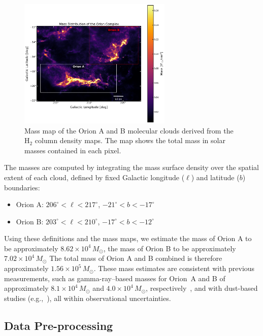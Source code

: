 \begin{figure}[t]
    \centering
    \includegraphics[width=0.65\textwidth]{figures/mass_distribution.png}
    \caption{Mass map of the Orion A and B molecular clouds derived from the H$_2$ column density maps. The map shows the total mass in solar masses contained in each pixel.}
    \label{fig:mass_map}
\end{figure}

The masses are computed by integrating the mass surface density over the spatial extent of each cloud, defined by fixed Galactic longitude ($\ell$) and latitude ($b$) boundaries:

\begin{itemize}
    \item Orion A: $206^\circ < \ell < 217^\circ$, $-21^\circ < b < -17^\circ$
    \item Orion B: $203^\circ < \ell < 210^\circ$, $-17^\circ < b < -12^\circ$
\end{itemize}

Using these definitions and the mass maps, we estimate the mass of Orion A to be approximately $8.62 \times 10^4 \, M_\odot$, the mass of Orion B to be approximately $7.02 \times 10^4 \, M_\odot$
The total mass of Orion A and B combined is therefore approximately $1.56 \times 10^5 \, M_\odot$.
These mass estimates are consistent with previous measurements, such as gamma-ray–based masses for Orion~A and B of approximately \( 8.1 \times 10^4\,M_\odot \) and \( 4.0 \times 10^4\,M_\odot \), respectively~\cite{okumura2009fermi}, and with dust-based studies (e.g.,~\cite{lombardi2014herschel}), all within observational uncertainties.

\subsection{Data Pre-processing}

